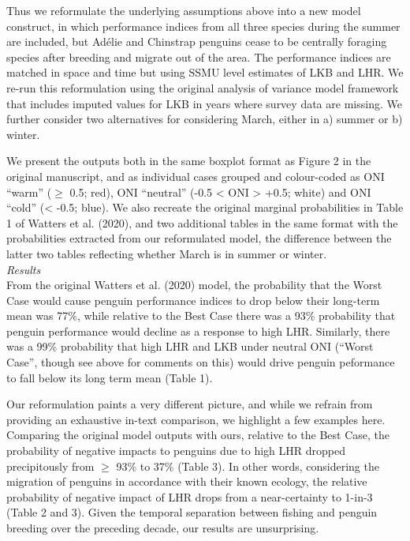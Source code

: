 \documentclass[]{elsarticle} %
\begin{document}
Thus we reformulate the underlying assumptions above into a new model
construct, in which performance indices from all three species during
the summer are included, but Adélie and Chinstrap penguins cease to be
centrally foraging species after breeding and migrate out of the area.
The performance indices are matched in space and time but using SSMU
level estimates of LKB and LHR. We re-run this reformulation using the
original analysis of variance model framework that includes imputed
values for LKB in years where survey data are missing. We further
consider two alternatives for considering March, either in a) summer or
b) winter.

We present the outputs both in the same boxplot format as Figure 2 in
the original manuscript, and as individual cases grouped and
colour-coded as ONI ``warm'' (\(\geqslant\) 0.5; red), ONI ``neutral''
(-0.5 \textless{} ONI \textgreater{} +0.5; white) and ONI ``cold''
(\textless{} -0.5; blue). We also recreate the original marginal
probabilities in Table 1 of Watters et al. (2020), and two additional
tables in the same format with the probabilities extracted from our
reformulated model, the difference between the latter two tables
reflecting whether March is in summer or winter.\\
\newline   \emph{Results}\\
From the original Watters et al. (2020) model, the probability that the
Worst Case would cause penguin performance indices to drop below their
long-term mean was 77\%, while relative to the Best Case there was a
93\% probability that penguin performance would decline as a response to
high LHR. Similarly, there was a 99\% probability that high LHR and LKB
under neutral ONI (``Worst Case'', though see above for comments on
this) would drive penguin peformance to fall below its long term mean
(Table 1).

Our reformulation paints a very different picture, and while we refrain
from providing an exhaustive in-text comparison, we highlight a few
examples here. Comparing the original model outputs with ours, relative
to the Best Case, the probability of negative impacts to penguins due to
high LHR dropped precipitously from \(\geqslant\) 93\% to 37\% (Table
3). In other words, considering the migration of penguins in accordance
with their known ecology, the relative probability of negative impact of
LHR drops from a near-certainty to 1-in-3 (Table 2 and 3). Given the
temporal separation between fishing and penguin breeding over the
preceding decade, our results are unsurprising.
\end{document}
